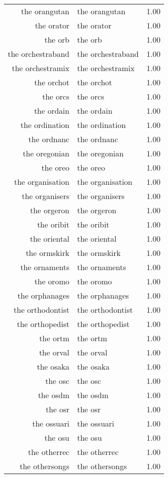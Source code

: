 \begin{table}[ht]
\begin{tabular}{rlr}
  the orangutan & the orangutan & 1.00 \\ 
  the orator & the orator & 1.00 \\ 
  the orb & the orb & 1.00 \\ 
  the orchestraband & the orchestraband & 1.00 \\ 
  the orchestramix & the orchestramix & 1.00 \\ 
  the orchot & the orchot & 1.00 \\ 
  the orcs & the orcs & 1.00 \\ 
  the ordain & the ordain & 1.00 \\ 
  the ordination & the ordination & 1.00 \\ 
  the ordnanc & the ordnanc & 1.00 \\ 
  the oregonian & the oregonian & 1.00 \\ 
  the oreo & the oreo & 1.00 \\ 
  the organisation & the organisation & 1.00 \\ 
  the organisers & the organisers & 1.00 \\ 
  the orgeron & the orgeron & 1.00 \\ 
  the oribit & the oribit & 1.00 \\ 
  the oriental & the oriental & 1.00 \\ 
  the ormskirk & the ormskirk & 1.00 \\ 
  the ornaments & the ornaments & 1.00 \\ 
  the oromo & the oromo & 1.00 \\ 
  the orphanages & the orphanages & 1.00 \\ 
  the orthodontist & the orthodontist & 1.00 \\ 
  the orthopedist & the orthopedist & 1.00 \\ 
  the ortm & the ortm & 1.00 \\ 
  the orval & the orval & 1.00 \\ 
  the osaka & the osaka & 1.00 \\ 
  the osc & the osc & 1.00 \\ 
  the osdm & the osdm & 1.00 \\ 
  the osr & the osr & 1.00 \\ 
  the ossuari & the ossuari & 1.00 \\ 
  the osu & the osu & 1.00 \\ 
  the otherrec & the otherrec & 1.00 \\ 
  the othersongs & the othersongs & 1.00 \\ 

\end{tabular}
\end{table}
